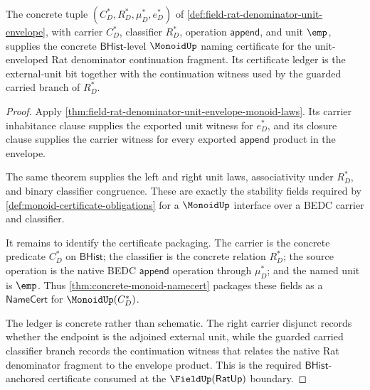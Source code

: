 \begin{theorem}
\label{thm:field-rat-denominator-unit-envelope-monoid-namecert}
The concrete tuple $(C_D^\ast,R_D^\ast,\mu_D^\ast,e_D^\ast)$ of
\autoref{def:field-rat-denominator-unit-envelope}, with carrier
$C_D^\ast$, classifier $R_D^\ast$, operation $\mathsf{append}$, and unit
$\emp$, supplies the concrete $\mathsf{BHist}$-level $\MonoidUp$ naming
certificate for the unit-enveloped Rat denominator continuation fragment.
Its certificate ledger is the external-unit bit together with the continuation
witness used by the guarded carried branch of $R_D^\ast$.
\end{theorem}
\begin{proof}
Apply \autoref{thm:field-rat-denominator-unit-envelope-monoid-laws}. Its
carrier inhabitance clause supplies the exported unit witness for $e_D^\ast$,
and its closure clause supplies the carrier witness for every exported
$\mathsf{append}$ product in the envelope.

The same theorem supplies the left and right unit laws, associativity under
$R_D^\ast$, and binary classifier congruence. These are exactly the stability
fields required by \autoref{def:monoid-certificate-obligations} for a
$\MonoidUp$ interface over a BEDC carrier and classifier.

It remains to identify the certificate packaging. The carrier is the concrete
predicate $C_D^\ast$ on $\mathsf{BHist}$; the classifier is the concrete
relation $R_D^\ast$; the source operation is the native BEDC
$\mathsf{append}$ operation through $\mu_D^\ast$; and the named unit is
$\emp$. Thus \autoref{thm:concrete-monoid-namecert} packages these fields as a
$\mathsf{NameCert}$ for $\MonoidUp(C_D^\ast)$.

The ledger is concrete rather than schematic. The right carrier disjunct records
whether the endpoint is the adjoined external unit, while the guarded carried
classifier branch records the continuation witness that relates the native
Rat denominator fragment to the envelope product. This is the required
$\mathsf{BHist}$-anchored certificate consumed at the $\FieldUp(\mathsf{RatUp})$
boundary.
\end{proof}

